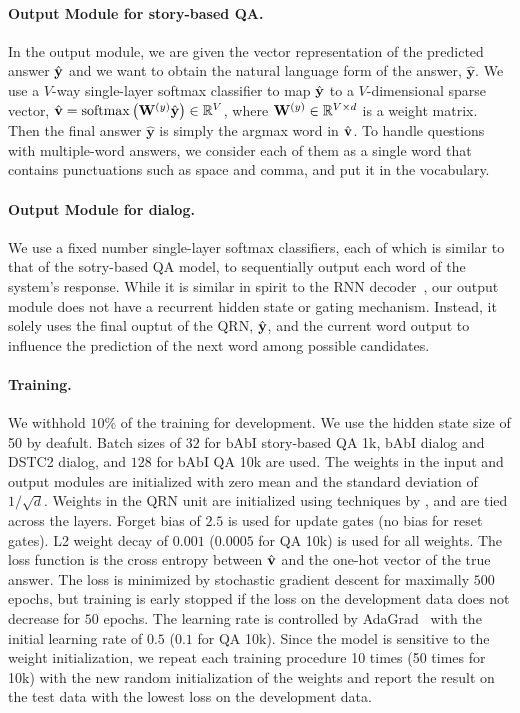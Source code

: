 \documentclass[table]{article}
\begin{document}
\paragraph{Output Module for story-based QA.} In the output module, we are given the vector representation of the predicted answer $\hat{\bf y}$ and we want to obtain the natural language form of the answer, $\hat{\bm y}$.
We use a $V$-way single-layer softmax classifier to map $\hat{\bf y}$ to a $V$-dimensional sparse vector, $\hat{\bf v} = \mathrm{softmax}\left( {\bf W}^{(y)} \hat{\bf y} \right) \in \mathbb{R}^V$, where ${\bf W}^{(y)} \in \mathbb{R}^{V \times d}$ is a weight matrix.
Then the final answer $\hat{\bm y}$ is simply the argmax word in $\hat{\bf v}$. 
To handle questions with multiple-word answers, we consider each of them as a single word that contains punctuations such as space and comma, and put it in the vocabulary.

\paragraph{Output Module for dialog.}
We use a fixed number single-layer softmax classifiers, each of which is similar to that of the sotry-based QA model, to sequentially output each word of the system's response.
While it is similar in spirit to the RNN decoder~\citep{GRU}, our output module does not have a recurrent hidden state or gating mechanism.
Instead, it solely uses the final ouptut of the QRN, $\hat{\bf y}$, and the current word output to influence the prediction of the next word among possible candidates.





\paragraph{Training.} 
We withhold $10\%$ of the training  for development.
We use the hidden state size of 50 by deafult.
Batch sizes of $32$ for bAbI story-based QA 1k, bAbI dialog and DSTC2 dialog, and $128$ for bAbI QA 10k are used.
The weights in the input and output modules are initialized with zero mean and the standard deviation  of $1/\sqrt{d}$.
Weights in the QRN unit are initialized using techniques by \citet{glorot2010understanding}, and are tied across the layers.
Forget bias of $2.5$ is used for update gates (no bias for reset gates).
L2 weight decay of $0.001$ ($0.0005$ for QA 10k) is used for all weights.
The loss function is the cross entropy between $\hat{\bf v}$ and the one-hot vector of the true answer.
The loss is minimized by stochastic gradient descent for maximally $500$ epochs, but training is early stopped if the loss on the development data does not decrease for $50$ epochs.
The learning rate is controlled by AdaGrad~\citep{duchi2011adaptive}
with the initial learning rate of $0.5$ ($0.1$ for QA 10k).
Since the model is sensitive to the weight initialization,
we repeat each training procedure 10 times (50 times for 10k) with the new random initialization of the weights and report the result on the test data with the lowest loss on the development data.
\end{document}
